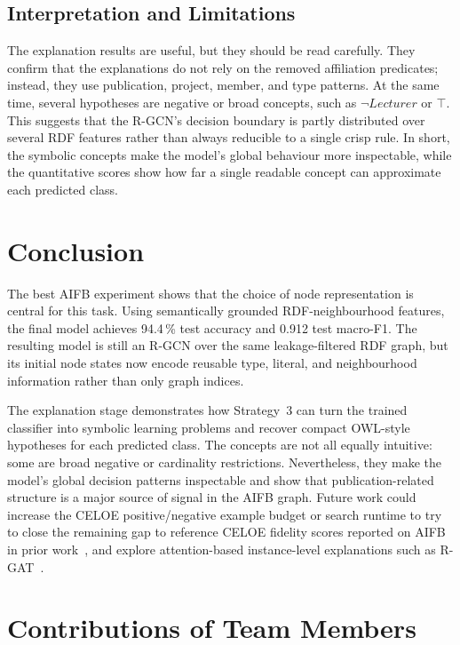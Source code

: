 \documentclass[runningheads]{llncs}
\begin{document}
\subsection{Interpretation and Limitations}

The explanation results are useful, but they should be read carefully.  They confirm that the explanations
do not rely on the removed affiliation predicates; instead, they use publication, project, member, and type
patterns.  At the same time, several hypotheses are negative or broad concepts, such as
$\neg\textit{Lecturer}$ or $\top$.  This suggests that the R-GCN's decision boundary is partly distributed
over several RDF features rather than always reducible to a single crisp rule.  In short, the symbolic
concepts make the model's global behaviour more inspectable, while the quantitative scores show how far a
single readable concept can approximate each predicted class.

\section{Conclusion}

The best AIFB experiment shows that the choice of node representation is central for this task.
Using semantically grounded RDF-neighbourhood features, the final model achieves 94.4\,\% test accuracy
and 0.912 test macro-F1.
The resulting model is still an R-GCN over the same leakage-filtered RDF graph, but its initial node
states now encode reusable type, literal, and neighbourhood information rather than only graph indices.

The explanation stage demonstrates how Strategy~3 can turn the trained classifier into symbolic
learning problems and recover compact OWL-style hypotheses for each predicted class.  The concepts are
not all equally intuitive: some are broad negative or cardinality restrictions.  Nevertheless, they make
the model's global decision patterns inspectable and show that publication-related structure is a major
source of signal in the AIFB graph.  Future work could increase the CELOE positive/negative example
budget or search runtime to try to close the remaining gap to reference CELOE fidelity scores reported
on AIFB in prior work~\cite{edge2024}, and explore attention-based instance-level explanations such as
R-GAT~\cite{busbridge2019}.

\section*{Contributions of Team Members}
{}
\end{document}
